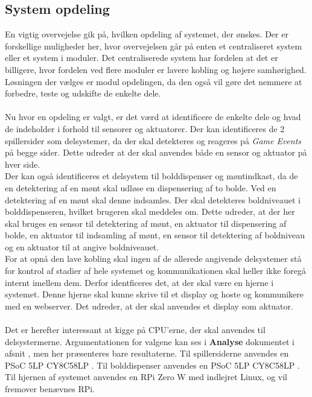 \documentclass[Rapport/Rapport_main.tex]{subfiles}
\begin{document}
\subsection{System opdeling}
En vigtig overvejelse gik på, hvilken opdeling af systemet, der ønskes. Der er forskellige muligheder her, hvor overvejelsen går på enten et centraliseret system eller et system i moduler. Det centraliserede system har fordelen at det er billigere, hvor fordelen ved flere moduler er lavere kobling og højere samhørighed. Løsningen der vælges er modul opdelingen, da den også vil gøre det nemmere at forbedre, teste og udskifte de enkelte dele.\\\\
Nu hvor en opdeling er valgt, er det værd at identificere de enkelte dele og hvad de indeholder i forhold til sensorer og aktuatorer. Der kan identificeres de 2 spillersider som delsystemer, da der skal detekteres og reageres på \textit{Game Events} på begge sider. Dette udreder at der skal anvendes både en sensor og aktuator på hver side.\\ 
Der kan også identificeres et delsystem til bolddispenser og møntindkast, da de en detektering af en mønt skal udløse en dispensering af to bolde. Ved en detektering af en mønt skal denne indsamles. Der skal detekteres boldniveauet i bolddispenseren, hvilket brugeren skal meddeles om. Dette udreder, at der her skal bruges en sensor til detektering af mønt, en aktuator til dispensering af bolde, en aktuator til indsamling af mønt, en sensor til detektering af boldniveau og en aktuator til at angive boldniveauet.\\
For at opnå den lave kobling skal ingen af de allerede angivende delsystemer stå for kontrol af stadier af hele systemet og kommunikationen skal heller ikke foregå internt imellem dem. Derfor identficeres det, at der skal være en hjerne i systemet. Denne hjerne skal kunne skrive til et display og hoste og kommunikere med en webserver. Det udreder, at der skal anvendes et display som aktuator.\\\\
Det er herefter interessant at kigge på CPU'erne, der skal anvendes til delsystermerne. Argumentationen for valgene kan ses i \textbf{Analyse} dokumentet i afsnit , men her præsenteres bare resultaterne. Til spillersiderne anvendes en PSoC 5LP CY8C58LP \cite{psoc5lp}. Til bolddispenser anvendes en PSoC 5LP CY8C58LP \cite{psoc5lp}. Til hjernen af systemet anvendes en RPi Zero W med indlejret Linux\cite{rpi_webpage}, og vil fremover benævnes RPi.
\end{document}
